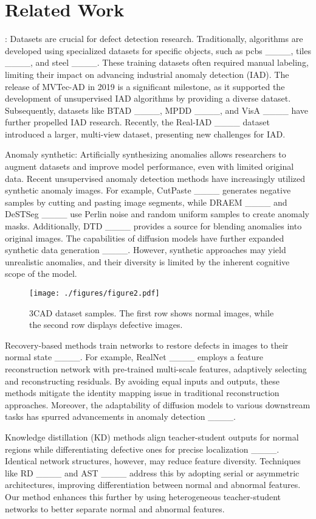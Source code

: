 \section{Related Work}
: Datasets are crucial for defect detection research. Traditionally, algorithms are developed using specialized datasets for specific objects, such as pcbs ____, tiles ____, and steel ____. These training datasets often required manual labeling, limiting their impact on advancing industrial anomaly detection (IAD). The release of MVTec-AD in 2019 is a significant milestone, as it supported the development of unsupervised IAD algorithms by providing a diverse dataset. Subsequently, datasets like BTAD ____, MPDD ____, and VisA ____ have further propelled IAD research. Recently, the Real-IAD ____ dataset introduced a larger, multi-view dataset, presenting new challenges for IAD. %

Anomaly synthetic: Artificially synthesizing anomalies allows researchers to augment datasets and improve model performance, even with limited original data. Recent unsupervised anomaly detection methods have increasingly utilized synthetic anomaly images. For example, CutPaste ____ generates negative samples by cutting and pasting image segments, while DRAEM ____ and DeSTSeg ____ use Perlin noise and random uniform samples to create anomaly masks. Additionally, DTD ____ provides a source for blending anomalies into original images. The capabilities of diffusion models have further expanded synthetic data generation ____. However, synthetic approaches may yield unrealistic anomalies, and their diversity is limited by the inherent cognitive scope of the model.


\begin{figure*}[t]
    \centering
    \texttt{[image: ./figures/figure2.pdf]}
    \caption{3CAD dataset samples. The first row shows normal images, while the second row displays defective images.}
\label{fig2}
\end{figure*}


Recovery-based methods train networks to restore defects in images to their normal state ____. For example, RealNet ____ employs a feature reconstruction network with pre-trained multi-scale features, adaptively selecting and reconstructing residuals. By avoiding equal inputs and outputs, these methods mitigate the identity mapping issue in traditional reconstruction approaches. Moreover, the adaptability of diffusion models to various downstream tasks has spurred advancements in anomaly detection ____.

Knowledge distillation (KD) methods align teacher-student outputs for normal regions while differentiating defective ones for precise localization ____. 
Identical network structures, however, may reduce feature diversity. Techniques like RD ____ and AST ____ address this by adopting serial or asymmetric architectures, improving differentiation between normal and abnormal features. Our method enhances this further by using heterogeneous teacher-student networks to better separate normal and abnormal features.